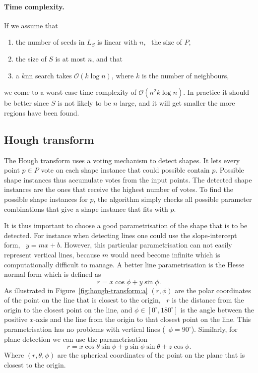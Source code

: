 \paragraph{Time complexity.} If we assume that 
\begin{enumerate}
	\item the number of seeds in $L_{S}$ is linear with $n$, \ie\ the size of $P$,
	\item the size of $S$ is at most $n$, and that
	\item a $k$nn search takes $\mathcal{O}{(k\log{n})}$, where $k$ is the number of neighbours,
\end{enumerate}
we come to a worst-case time complexity of $\mathcal{O}(n^2k\log{n})$.
In practice it should be better since $S$ is not likely to be $n$ large, and it will get smaller the more regions have been found.


\subsection{Hough transform}
The Hough transform uses a voting mechanism to detect shapes.
It lets every point $p \in P$ vote on each shape instance that could possible contain $p$.
Possible shape instances thus accumulate votes from the input points.
The detected shape instances are the ones that receive the highest number of votes.
To find the possible shape instances for $p$, the algorithm simply checks all possible parameter combinations that give a shape instance that fits with $p$.

It is thus important to choose a good parametrisation of the shape that is to be detected.
For instance when detecting lines one could use the slope-intercept form, \ie\ $y = mx+b$. 
However, this particular parametrisation can not easily represent vertical lines, because $m$ would need become infinite which is computationally difficult to manage. 
A better line parametrisation is the Hesse normal form which is defined as 
\[
r = x\cos{\phi} + y\sin{\phi}. 
\]
As illustrated in Figure~\ref{fig:hough-transform:a} $(r,\phi)$ are the polar coordinates of the point on the line that is closest to the origin, \ie\ $r$ is the distance from the origin to the closest point on the line, and $\phi \in [0^\circ, 180^\circ]$ is the angle between the positive $x$-axis and the line from the origin to that closest point on the line. 
This parametrisation has no problems with vertical lines (\ie\ $\phi=90^{\circ}$).
Similarly, for plane detection we can use the parametrisation
\[
r = x \cos{\theta} \sin{\phi} + y \sin{\phi} \sin{\theta} + z \cos{\phi}.
\]
Where $(r, \theta, \phi)$ are the spherical coordinates of the point on the plane that is closest to the origin.

